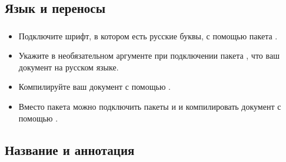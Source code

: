 \documentclass{beamer}
\begin{document}
\subsection{Язык и переносы}

\begin{frame}[fragile]
\frametitle{\insertsubsection}
\vspace{-2ex}
\begin{itemize}
\item Подключите шрифт, в котором есть русские буквы, с помощью пакета
  .
\item Укажите в необязательном аргументе при подключении пакета ,
  что ваш документ на русском языке.
\item Компилируйте ваш документ с помощью .
\begin{code}
\usepackage{fontspec}
\setmainfont{CMU Serif} %
\usepackage[russian]{babel} %
\end{code}
\item Вместо пакета  можно подключить пакеты 
  и  и компилировать документ с помощью .
\begin{code}
\usepackage[T2A]{fontenc} %
\usepackage[utf8]{inputenc} %
\usepackage[russian]{babel} %
\end{code}
\end{itemize}
\end{frame}

\subsection{Название и аннотация}
\end{document}
